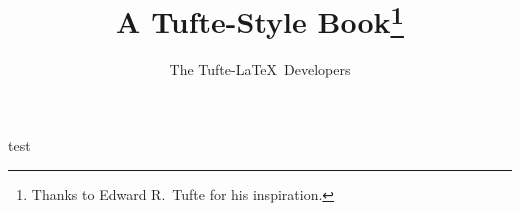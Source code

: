 \documentclass{scrbook}
\title{A Tufte-Style Book\thanks{Thanks to Edward R.~Tufte for his inspiration.}}
\author{The Tufte-LaTeX\ Developers}
\begin{document}
\maketitle

test
\end{document}
